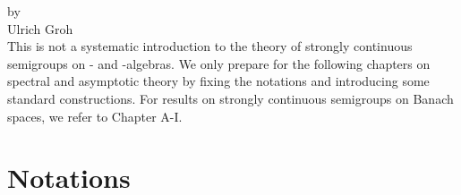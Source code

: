\label{chap:d1}
{\Large
\vspace*{-.75cm}
by \\[.25em]
Ulrich Groh
\vspace{.75cm}
\\
}
This is not a systematic introduction to the theory of strongly continuous semigroups on \CA- and \WA-algebras.
We only prepare for the following chapters on spectral and asymptotic theory by fixing the notations and introducing some standard constructions.
For results on strongly continuous semigroups on Banach spaces, we refer to Chapter A-I.%
\section{Notations}\label{sec:d1-1}

